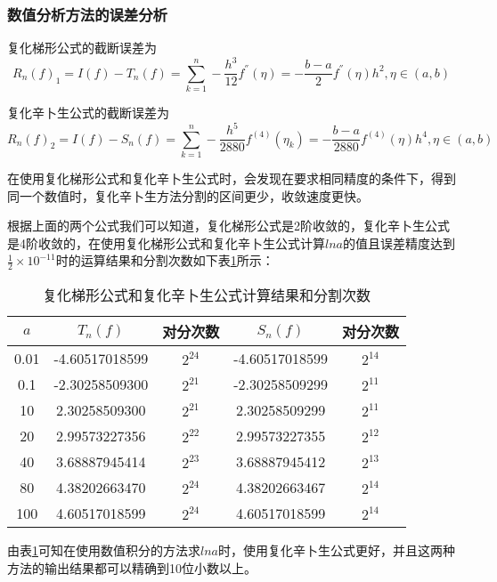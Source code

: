 \documentclass[UTF8]{ctexart}
\begin{document}
	\subsubsection{数值分析方法的误差分析}%
	\par{复化梯形公式的截断误差为}
	$$   R_n(f)_1=I(f)-T_n(f)=\sum_{k=1}^{n}-\frac{h^3}{12}f^{''}(\eta)=-\frac{b-a}{2}f^{''}(\eta)h^2  ,\eta \in(a,b) $$
	\par{复化辛卜生公式的截断误差为}
	$$   R_n(f)_2=I(f)-S_n(f)=\sum_{k=1}^{n}-\frac{h^5}{2880}f^{(4)}(\eta_k)=-\frac{b-a}{2880}f^{(4)}(\eta)h^4  ,\eta \in(a,b) $$
	\par{在使用复化梯形公式和复化辛卜生公式时，会发现在要求相同精度的条件下，得到同一个数值时，复化辛卜生方法分割的区间更少，收敛速度更快。}
	\par{根据上面的两个公式我们可以知道，复化梯形公式是2阶收敛的，复化辛卜生公式是4阶收敛的，在使用复化梯形公式和复化辛卜生公式计算$lna$的值且误差精度达到$\frac{1}{2}\times 10^{-11}$时的运算结果和分割次数如下表\ref{tab:FenGeCiShu}所示：}
	\begin{table}[!htbp]
		\centering
		\caption{复化梯形公式和复化辛卜生公式计算结果和分割次数}%
		\label{tab:FenGeCiShu} %
		\begin{tabular}{c|cc|cc}
			\hline 
			$a$   & $T_n(f)$         & 对分次数  & $S_n(f)$      & 对分次数 \\ 
			\hline 
			0.01  & -4.60517018599   & $2^{24}$ & -4.60517018599 &  $2^{14}$ \\ 
			0.1   & -2.30258509300   & $2^{21}$ & -2.30258509299 &  $2^{11}$ \\ 
			10    & 2.30258509300    & $2^{21}$ & 2.30258509299  &  $2^{11}$ \\ 
			20    & 2.99573227356    & $2^{22}$ & 2.99573227355  &  $2^{12}$ \\ 
			40    & 3.68887945414    & $2^{23}$ & 3.68887945412  &  $2^{13}$ \\ 
			80    & 4.38202663470    & $2^{24}$ & 4.38202663467  &  $2^{14}$ \\
			100   & 4.60517018599    & $2^{24}$ & 4.60517018599  &  $2^{14}$ \\ 
			\hline 
		\end{tabular} 
	\end{table}	
	\par{ 由表\ref{tab:FenGeCiShu}可知在使用数值积分的方法求$lna$时，使用复化辛卜生公式更好，并且这两种方法的输出结果都可以精确到10位小数以上。}
	
\end{document}
